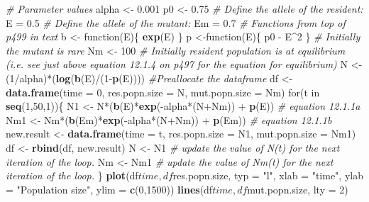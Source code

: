 \documentclass[]{book}
\newenvironment{Shaded}{\begin{snugshade}}{\end{snugshade}}
\newcommand{\KeywordTok}[1]{\textcolor[rgb]{0.13,0.29,0.53}{\textbf{{#1}}}}
\newcommand{\DataTypeTok}[1]{\textcolor[rgb]{0.13,0.29,0.53}{{#1}}}
\newcommand{\DecValTok}[1]{\textcolor[rgb]{0.00,0.00,0.81}{{#1}}}
\newcommand{\FloatTok}[1]{\textcolor[rgb]{0.00,0.00,0.81}{{#1}}}
\newcommand{\StringTok}[1]{\textcolor[rgb]{0.31,0.60,0.02}{{#1}}}
\newcommand{\CommentTok}[1]{\textcolor[rgb]{0.56,0.35,0.01}{\textit{{#1}}}}
\newcommand{\NormalTok}[1]{{#1}}
\begin{document}
\begin{Shaded}
\begin{Highlighting}[]
\CommentTok{# Parameter values}
\NormalTok{alpha <-}\StringTok{ }\FloatTok{0.001}
\NormalTok{p0 <-}\StringTok{ }\FloatTok{0.75}
\CommentTok{# Define the allele of the resident:}
\NormalTok{E =}\StringTok{ }\FloatTok{0.5}
\CommentTok{# Define the allele of the mutant:}
\NormalTok{Em =}\StringTok{ }\FloatTok{0.7}
\CommentTok{# Functions from top of p499 in text}
\NormalTok{b <-}\StringTok{ }\NormalTok{function(E)\{}
  \KeywordTok{exp}\NormalTok{(E)}
\NormalTok{\}}
\NormalTok{p <-function(E)\{}
  \NormalTok{p0 -}\StringTok{ }\NormalTok{E^}\DecValTok{2}
\NormalTok{\}}
\CommentTok{# Initially the mutant is rare}
\NormalTok{Nm <-}\StringTok{ }\DecValTok{100}
\CommentTok{# Initially resident population is at equilibrium (i.e. see just above equation 12.1.4 on p497 for the equation for equilibrium)}
\NormalTok{N <-}\StringTok{ }\NormalTok{(}\DecValTok{1}\NormalTok{/alpha)*(}\KeywordTok{log}\NormalTok{(}\KeywordTok{b}\NormalTok{(E)/(}\DecValTok{1}\NormalTok{-}\KeywordTok{p}\NormalTok{(E))))}
\CommentTok{#Preallocate the dataframe}
\NormalTok{df <-}\StringTok{ }\KeywordTok{data.frame}\NormalTok{(}\DataTypeTok{time =} \DecValTok{0}\NormalTok{, }\DataTypeTok{res.popn.size =} \NormalTok{N, }\DataTypeTok{mut.popn.size =} \NormalTok{Nm)}
\NormalTok{for(t in }\KeywordTok{seq}\NormalTok{(}\DecValTok{1}\NormalTok{,}\DecValTok{50}\NormalTok{,}\DecValTok{1}\NormalTok{))\{}
  \NormalTok{N1 <-}\StringTok{ }\NormalTok{N*(}\KeywordTok{b}\NormalTok{(E)*}\KeywordTok{exp}\NormalTok{(-alpha*(N+Nm)) +}\StringTok{ }\KeywordTok{p}\NormalTok{(E)) }\CommentTok{# equation 12.1.1a}
  \NormalTok{Nm1 <-}\StringTok{ }\NormalTok{Nm*(}\KeywordTok{b}\NormalTok{(Em)*}\KeywordTok{exp}\NormalTok{(-alpha*(N+Nm)) +}\StringTok{ }\KeywordTok{p}\NormalTok{(Em)) }\CommentTok{# equation 12.1.1b}
  \NormalTok{new.result <-}\StringTok{ }\KeywordTok{data.frame}\NormalTok{(}\DataTypeTok{time =} \NormalTok{t, }\DataTypeTok{res.popn.size =} \NormalTok{N1, }\DataTypeTok{mut.popn.size =} \NormalTok{Nm1)}
  \NormalTok{df <-}\StringTok{ }\KeywordTok{rbind}\NormalTok{(df, new.result)}
  \NormalTok{N <-}\StringTok{ }\NormalTok{N1 }\CommentTok{# update the value of N(t) for the next iteration of the loop.}
  \NormalTok{Nm <-}\StringTok{ }\NormalTok{Nm1 }\CommentTok{# update the value of Nm(t) for the next iteration of the loop.}
\NormalTok{\}}
\KeywordTok{plot}\NormalTok{(df$time, df$res.popn.size, }\DataTypeTok{typ =} \StringTok{"l"}\NormalTok{, }\DataTypeTok{xlab =} \StringTok{"time"}\NormalTok{, }\DataTypeTok{ylab =} \StringTok{"Population size"}\NormalTok{, }\DataTypeTok{ylim =} \KeywordTok{c}\NormalTok{(}\DecValTok{0}\NormalTok{,}\DecValTok{1500}\NormalTok{))}
\KeywordTok{lines}\NormalTok{(df$time, df$mut.popn.size, }\DataTypeTok{lty =} \DecValTok{2}\NormalTok{)}
\end{Highlighting}
\end{Shaded}
\end{document}
